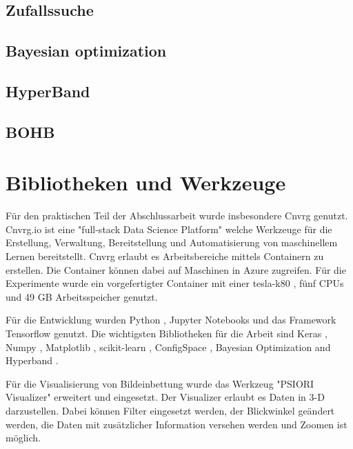 	\subsection{Zufallssuche}
			\cite{BergstraJamesandYoshuaBengio..2012}
			\cite{Michelucci.2018}
	\subsection{Bayesian optimization}
			\cite{Michelucci.2018}
	\subsection{HyperBand}	
			\cite{Li.2017}
	\subsection{BOHB}
			\cite{StefanFalkner.2018}	
	

	\section{Bibliotheken und Werkzeuge}
	\label{sec:BibliothekenundWerkzeuge}
	Für den praktischen Teil der Abschlussarbeit wurde insbesondere Cnvrg \cite{cnvrg.io.} genutzt. Cnvrg.io ist eine "full-stack Data Science Platform" welche Werkzeuge für die Erstellung, Verwaltung, Bereitstellung und Automatisierung von maschinellem Lernen bereitstellt. Cnvrg erlaubt es Arbeitsbereiche mittels Containern zu erstellen. Die Container können dabei auf Maschinen in Azure \cite{Micorsoft.2020} zugreifen. Für die Experimente wurde ein vorgefertigter Container mit einer tesla-k80 \cite{Nvidia.2020}, fünf CPUs und 49 GB Arbeitsspeicher genutzt. 

	Für die Entwicklung wurden Python \cite{PythonSoftwareFoundation.2020}, Jupyter Notebooks \cite{ProjectJupyter} und das Framework Tensorflow \cite{MartinAbadi.2015}  genutzt. Die wichtigsten Bibliotheken für die Arbeit sind Keras \cite{Chollet.2015} , Numpy \cite{Oliphant.2006} , Matplotlib \cite{Hunter.2007} , scikit-learn \cite{Pedregosa.2011} , ConfigSpace \cite{Lindauer.8162019} , Bayesian Optimization and Hyperband \cite{StefanFalkner.2018}. 
	
	Für die Visualisierung von Bildeinbettung wurde das Werkzeug "PSIORI Visualizer" erweitert und eingesetzt. Der Visualizer erlaubt es Daten in 3-D darzustellen. Dabei können Filter eingesetzt werden, der Blickwinkel geändert werden, die Daten mit zusätzlicher Information versehen werden und Zoomen ist möglich.
	
